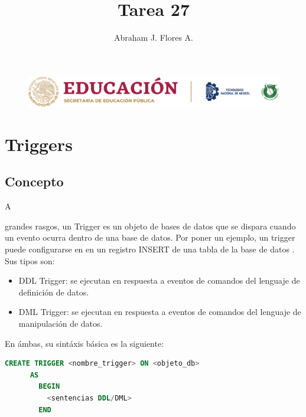 \documentclass[stu, 12pt, letterpaper, donotrepeattitle, floatsintext, natbib]{apa7}
\title{\Large Tarea 27}
\author{Abraham J. Flores A.\: 19211640} %
\affiliation{Tecnológico Nacional de México | Instituto Tecnológico de Tijuana}
\begin{document}
    \begin{figure}[ht]
      \centering
      \includegraphics[width=16cm]{logosITT.png}
    \end{figure}
    \maketitle

    \tableofcontents 

    \newpage
    \section*{Triggers}
    \subsection*{Concepto}
    A \begin{justifying}
      grandes rasgos, un Trigger es un objeto de bases de datos que se dispara cuando un
    evento ocurra dentro de una base de datos. Por poner un ejemplo, un trigger puede configurarse en
    en un registro INSERT de una tabla de la base de datos \citep{middha-no-date} %
     . Sus tipos son:\par
    \end{justifying}
    \begin{itemize}
      \item DDL Trigger: se ejecutan en respuesta a eventos de comandos del lenguaje de definición de datos.
      \item DML Trigger: se ejecutan en respuesta a eventos de comandos del lenguaje de manipulación de datos.
    \end{itemize}\par
    En ámbas, su sintáxis básica es la siguiente:
    \vspace{\baselineskip}
    \begin{lstlisting}[language=SQL]
      CREATE TRIGGER <nombre_trigger> ON <objeto_db>
      AS
        BEGIN
          <sentencias DDL/DML>
        END\end{lstlisting}
\end{document}
